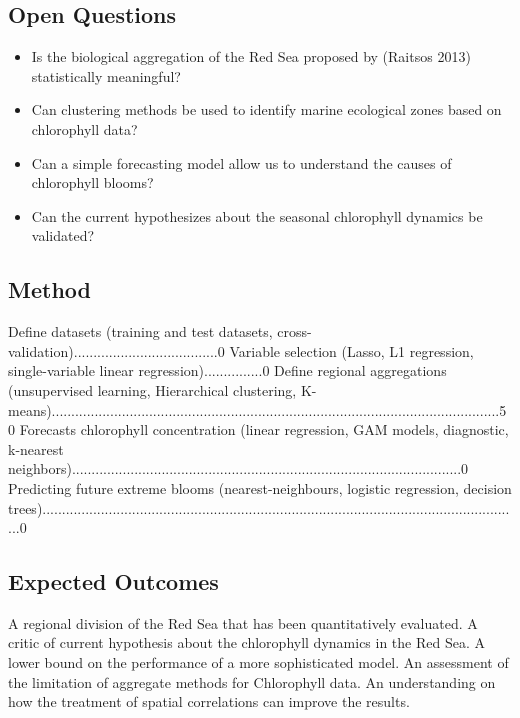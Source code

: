 \subsection{Open Questions}

\begin{itemize}
\item Is the biological aggregation of the Red Sea proposed by (Raitsos 2013) statistically meaningful?
\item Can clustering methods be used to identify marine ecological zones based on chlorophyll data?
\item Can a simple forecasting model allow us to understand the causes of chlorophyll blooms?
\item Can the current hypothesizes about the seasonal chlorophyll dynamics be validated?
\end{itemize}

\subsection{Method}

Define datasets (training and test datasets, cross-validation).....................................0%
Variable selection (Lasso, L1 regression, single-variable linear regression)...............0%
Define regional aggregations (unsupervised learning, Hierarchical clustering, K-means)...................................................................................................................50%
Forecasts chlorophyll concentration (linear regression, GAM models, diagnostic, k-nearest neighbors)....................................................................................................0%
Predicting future extreme blooms (nearest-neighbours, logistic regression, decision trees)...........................................................................................................................0%

\subsection{Expected Outcomes}

A regional division of the Red Sea that has been quantitatively evaluated.
A critic of current hypothesis about the chlorophyll dynamics in the Red Sea.
A lower bound on the performance of a more sophisticated model.
An assessment of the limitation of aggregate methods for Chlorophyll data.
An understanding on how the treatment of spatial correlations can improve the results.

